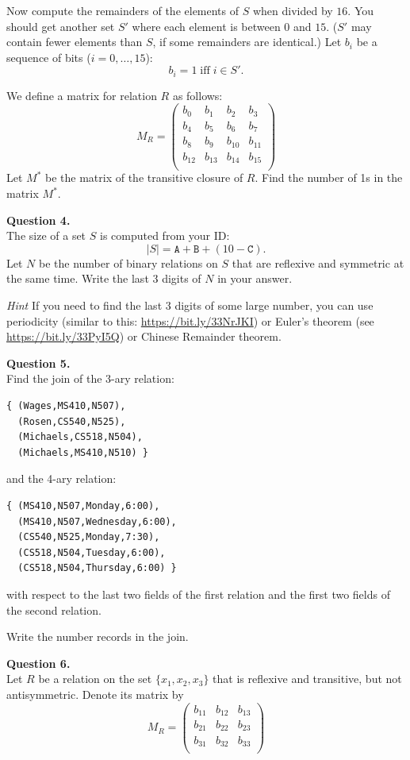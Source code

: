 \documentclass[jou]{apa6}
\begin{document}
Now compute the remainders of the elements of $S$ when divided by $16$. 
You should get another set $S'$ where each element is between $0$ and $15$. 
($S'$ may contain fewer elements than $S$, if some remainders are identical.)
Let $b_i$ be a sequence of bits ($i = 0,\ldots,15$):
$$b_i = 1\;\text{iff}\;i \in S'.$$

We define a matrix for relation $R$ as follows:
$$M_R = \left( \begin{array}{cccc}
b_{0} & b_1 & b_2 & b_3 \\
b_{4} & b_5 & b_6 & b_7 \\
b_{8} & b_9 & b_{10} & b_{11} \\
b_{12} & b_{13} & b_{14} & b_{15} \\
\end{array} \right)$$
Let $M^{\ast}$ be the matrix of the transitive closure of $R$. 
Find the number of 1s in the matrix $M^{\ast}$.


\vspace{6pt}
{\bf Question 4.}\\
The size of a set $S$ is computed from your ID:
$$|S| = \mathtt{A}+\mathtt{B}+(10 - \mathtt{C}).$$ 
Let $N$ be the number of binary relations on $S$ that are  
reflexive and symmetric at the same time.
Write the last $3$ digits of $N$ in your answer.

{\em Hint} If you need to find the last $3$ digits of some large number, you 
can use periodicity (similar to this: \url{https://bit.ly/33NrJKI}) or Euler's theorem 
(see \url{https://bit.ly/33PyI5Q}) or Chinese Remainder theorem.


\vspace{6pt}
{\bf Question 5.}\\
Find the join of the 3-ary relation:
\begin{verbatim}
{ (Wages,MS410,N507),
  (Rosen,CS540,N525),
  (Michaels,CS518,N504),
  (Michaels,MS410,N510) }
\end{verbatim}
and the 4-ary relation:
\begin{verbatim}
{ (MS410,N507,Monday,6:00), 
  (MS410,N507,Wednesday,6:00), 
  (CS540,N525,Monday,7:30),
  (CS518,N504,Tuesday,6:00), 
  (CS518,N504,Thursday,6:00) }
\end{verbatim}
with respect to the last two fields of the first relation and 
the first two fields of the second relation. 

Write the number records in the join.

\vspace{6pt}
{\bf Question 6.}\\
Let $R$ be a relation on the set $\{x_1,x_2,x_3\}$ that is reflexive and transitive, but not antisymmetric.
Denote its matrix by
$$M_R =  \left( \begin{array}{ccc}
b_{11} & b_{12} & b_{13} \\
b_{21} & b_{22} & b_{23} \\
b_{31} & b_{32} & b_{33} \\
\end{array} \right)$$
\end{document}
